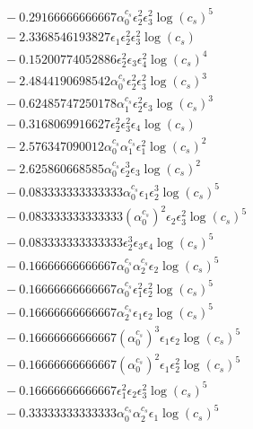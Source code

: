 \documentclass[10pt]{article}
\begin{document}
\begin{align*}
&{}  - 0.29166666666667 \alpha_{0}^{c_s} \epsilon_{2}^{2} \epsilon_{3}^{2} \log{\left(c_{s} \right)}^{5} \\
&{}  - 2.3368546193827 \epsilon_{1} \epsilon_{2}^{2} \epsilon_{3}^{2} \log{\left(c_{s} \right)} \\
&{}  - 0.15200774052886 \epsilon_{2}^{2} \epsilon_{3} \epsilon_{4}^{2} \log{\left(c_{s} \right)}^{4} \\
&{}  - 2.4844190698542 \alpha_{0}^{c_s} \epsilon_{2}^{2} \epsilon_{3}^{2} \log{\left(c_{s} \right)}^{3} \\
&{}  - 0.62485747250178 \alpha_{1}^{c_s} \epsilon_{2}^{2} \epsilon_{3} \log{\left(c_{s} \right)}^{3} \\
&{}  - 0.3168069916627 \epsilon_{2}^{2} \epsilon_{3}^{2} \epsilon_{4} \log{\left(c_{s} \right)} \\
&{}  - 2.576347090012 \alpha_{0}^{c_s} \alpha_{1}^{c_s} \epsilon_{1}^{2} \log{\left(c_{s} \right)}^{2} \\
&{}  - 2.625860668585 \alpha_{0}^{c_s} \epsilon_{2}^{3} \epsilon_{3} \log{\left(c_{s} \right)}^{2} \\
&{}  - 0.083333333333333 \alpha_{0}^{c_s} \epsilon_{1} \epsilon_{2}^{3} \log{\left(c_{s} \right)}^{5} \\
&{}  - 0.083333333333333 \left(\alpha_{0}^{c_s}\right)^{2} \epsilon_{2} \epsilon_{3}^{2} \log{\left(c_{s} \right)}^{5} \\
&{}  - 0.083333333333333 \epsilon_{2}^{3} \epsilon_{3} \epsilon_{4} \log{\left(c_{s} \right)}^{5} \\
&{}  - 0.16666666666667 \alpha_{0}^{c_s} \alpha_{2}^{c_s} \epsilon_{2} \log{\left(c_{s} \right)}^{5} \\
&{}  - 0.16666666666667 \alpha_{0}^{c_s} \epsilon_{1}^{2} \epsilon_{2}^{2} \log{\left(c_{s} \right)}^{5} \\
&{}  - 0.16666666666667 \alpha_{2}^{c_s} \epsilon_{1} \epsilon_{2} \log{\left(c_{s} \right)}^{5} \\
&{}  - 0.16666666666667 \left(\alpha_{0}^{c_s}\right)^{3} \epsilon_{1} \epsilon_{2} \log{\left(c_{s} \right)}^{5} \\
&{}  - 0.16666666666667 \left(\alpha_{0}^{c_s}\right)^{2} \epsilon_{1} \epsilon_{2}^{2} \log{\left(c_{s} \right)}^{5} \\
&{}  - 0.16666666666667 \epsilon_{1}^{2} \epsilon_{2} \epsilon_{3}^{2} \log{\left(c_{s} \right)}^{5} \\
&{}  - 0.33333333333333 \alpha_{0}^{c_s} \alpha_{2}^{c_s} \epsilon_{1} \log{\left(c_{s} \right)}^{5} \\

\end{align*}
\end{document}
